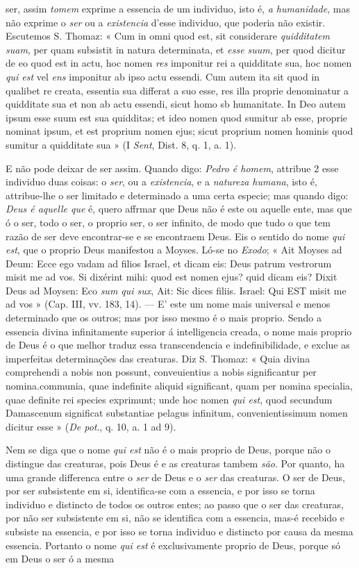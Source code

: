 ser, assim \emph{tomem} exprime a essencia de um individuo, isto é, \emph{a humanidade}, mas não exprime o \emph{ser} ou a \emph{existencia} d'esse individuo, que poderia não existir. Escutemos S. Thomaz: « Cum in omni quod est, sit considerare \emph{quidditatem suam}, per quam subsistit in natura determinata, et \emph{esse suum}, per quod dicitur de eo quod est in actu, hoc nomen \emph{res} imponitur rei a quidditate sua, hoc nomen \emph{qui est} vel \emph{ens} imponitur ab ipso actu essendi. Cum autem ita sit quod in qualibet re creata, essentia sua differat a suo esse, res illa proprie denominatur a quidditate sua et non ab actu essendi, sicut homo sb humanitate. In Deo autem ipsum esse suum est sua quidditas; et ideo nomen quod sumitur ab esse, proprie nominat ipsum, et est proprium nomen ejus; sicut proprium nomen hominis quod sumitur a quidditate sua » (I \emph{Sent}, Dist. 8, q. 1, a. 1).\par E não pode deixar de ser assim. Quando digo: \emph{Pedro é homem}, attribue 2 esse individuo duas coisas: o \emph{ser}, ou a \emph{existencia}, e a \emph{natureza humana}, isto é, attribue-lhe o ser limitado e determinado a uma certa especie; mas quando digo: \emph{Deus é aquelle que} é, quero affrmar que Deus não é este ou aquelle ente, mas que ó o ser, todo o ser, o proprio ser, o ser infinito, de modo que tudo o que tem razão de ser deve encontrar-se e se encontraem Deus. Eis o sentido do nome \emph{qui est}, que o proprio Deus manifestou a Moyses. Ló-se no \emph{Exodo}; « Ait Moyses ad Deum: Ecce ego vadam ad filios Israel, et dicam eis: Deus patrum vestrorum misit me ad vos. Si dixérint mihi: quod est nomen ejus? quid dicam eis? Dixit Deus ad Moysen: Eco \emph{sum qui sux}, Ait: Sic dices filiis. Israel: Qui EST misit me ad vos » (Cap. III, vv. 183, 14). --- E' este um nome mais universal e menos determinado que os outros; mas por isso mesmo é o mais proprio. Sendo a essencia divina infinitamente superior á intelligencia creada, o nome mais proprio de Deus é o que melhor traduz essa transcendencia e indefinibilidade, e exclue as imperfeitas determinações das creaturas. Diz S. Thomaz: « Quia divina comprehendi a nobis non possunt, conveuientius a nobis significantur per nomina.communia, quae indefinite aliquid significant, quam per nomina specialia, quae definite rei species exprimunt; unde hoc nomen \emph{qui est}, quod secundum Damascenum significat substantiae pelagus infinitum, convenientissimum nomen dicitur esse » (\emph{De pot}., q. 10, a. 1 ad 9).\par Nem se diga que o nome \emph{qui est} não é o mais proprio de Deus, porque não o distingue das creaturas, pois Deus é e as creaturas tambem \emph{são}. Por quanto, ha uma grande differenca entre o \emph{ser} de Deus e o \emph{ser} das creaturas. O ser de Deus, por ser subsistente em si, identifica-se com a essencia, e por isso se torna individuo e distincto de todos os outros entes; ao passo que o ser das creaturas, por não ser subsistente em si, não se identifica com a essencia, mas-é recebido e subsiste na essencia, e por isso se torna individuo e distincto por causa da mesma essencia. Portanto o nome \emph{qui est} é exclusivamente proprio de Deus, porque só em Deus o ser ó a mesma 